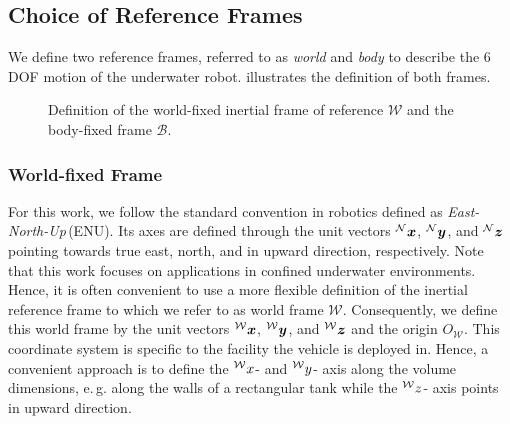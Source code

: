 \subsection{Choice of Reference Frames}
We define two reference frames, referred to as \textit{world} and \textit{body} to describe the 6\,DOF motion of the underwater robot.
 illustrates the definition of both frames.
\begin{figure}[tb]
	\centering
	
	\caption{Definition of the world-fixed inertial frame of reference $\mathcal{W}$ and the body-fixed frame $\mathcal{B}$.}
 \label{fig:reference_frames}
\end{figure}

\subsubsection{World-fixed Frame}
For this work, we follow the standard convention in robotics defined as \textit{East-North-Up}\,(ENU).
Its axes are defined through the unit vectors $\prescript{\mathcal{N}}{}{\mbox{$\bm{x}$}}$, $\prescript{\mathcal{N}}{}{\mbox{$\bm{y}$}}$, and $\prescript{\mathcal{N}}{}{\mbox{$\bm{z}$}}$ pointing towards true east, north, and in upward direction, respectively.
Note that this work focuses on applications in confined underwater environments.
Hence, it is often convenient to use a more flexible definition of the inertial reference frame to which we refer to as world frame $\mathcal{W}$.
Consequently, we define this world frame by the unit vectors $\prescript{\mathcal{W}}{}{\mbox{$\bm{x}$}}$, $\prescript{\mathcal{W}}{}{\mbox{$\bm{y}$}}$, and $\prescript{\mathcal{W}}{}{\mbox{$\bm{z}$}}$ and the origin ${O}_{\mathcal{W}}$.
This coordinate system is specific to the facility the vehicle is deployed in.
Hence, a convenient approach is to define the $\prescript{\mathcal{W}}{}{x}$- and $\prescript{\mathcal{W}}{}{y}$- axis along the volume dimensions, e.\,g. along the walls of a rectangular tank while the $\prescript{\mathcal{W}}{}{z}$- axis points in upward direction.
%
%
